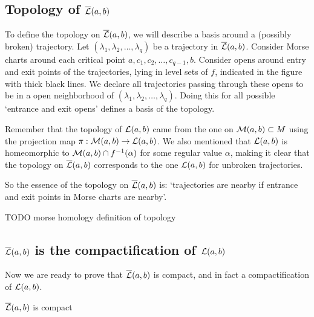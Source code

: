     


\subsection{Topology of $\overline{\mathcal L}(a, b)$}

To define the topology on $\overline{\mathcal L}(a, b)$,
we will describe a basis around a (possibly broken) trajectory.
Let $(\lambda_1, \lambda_2, \ldots, \lambda_q)$ be a trajectory in $\overline{\mathcal L}(a, b)$.
Consider Morse charts around each critical point  $a, c_1, c_2, \ldots, c_{q-1}, b$.
Consider opens around entry and exit points of the trajectories, lying in level sets of $f$, indicated in the figure with thick black lines.
We declare all trajectories passing through these opens to be in a open neighborhood of $(\lambda_1, \lambda_2, \ldots, \lambda_q)$.
Doing this for all possible `entrance and exit opens' defines a basis of the topology.

Remember that the topology of  $\mathcal L(a, b)$ came from the one on $\mathcal M(a, b) \subset M$ using the projection map $\pi: \mathcal M(a, b) \to \mathcal L(a, b) $.
We also mentioned that $\mathcal L(a, b)$ is homeomorphic to $\mathcal M(a, b) \cap  f^{-1}(\alpha)$ for some regular value $\alpha$, making it clear that the topology on $\overline{\mathcal L}(a, b)$ corresponds to the one  $\mathcal L(a, b)$ for unbroken trajectories.

So the essence of the topology on $\overline{\mathcal L}(a, b)$ is: `trajectories are nearby if entrance and exit points in Morse charts are nearby'.
\begin{marginfigure}
    \centering
    \caption{TODO morse homology definition of topology}
    \label{fig:morse-homology-definition-of-topology}
\end{marginfigure}

\subsection{$\overline{\mathcal L}(a, b)$ is the compactification of $\mathcal L(a, b)$}
Now we are ready to prove that $\overline{\mathcal L}(a, b)$ is compact, and in fact a compactification of  $\mathcal L(a, b)$.
\begin{theorem}
    $\overline{\mathcal L}(a, b)$ is compact
\end{theorem}

